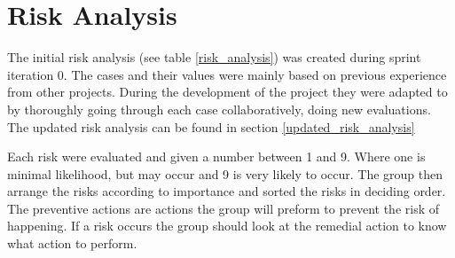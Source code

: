 \section{Risk Analysis} 
\label{riskAnalysis}
The initial risk analysis (see table \ref{risk_analysis}) was created during sprint iteration 0. The cases and their values were mainly based on previous experience from other projects. During the development of the project they were adapted to by thoroughly going through each case collaboratively, doing new evaluations. The updated risk analysis can be found in section \ref{updated_risk_analysis} 

Each risk were evaluated and given a number between 1 and 9. Where one is minimal likelihood, but may occur and 9 is very likely to occur. The group then arrange the risks according to importance and sorted the risks in deciding order. The preventive actions are actions the group will preform to prevent the risk of happening. If a risk occurs the group should look at the remedial action to know what action to perform. 


